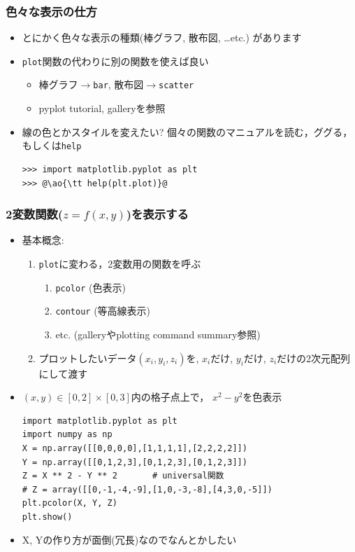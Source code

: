\documentclass[10pt,dvipdfmx]{beamer}
\newcommand{\ao}[1]{{\color{blue}#1}}
\begin{document}
\begin{frame}[fragile]
\frametitle{色々な表示の仕方}
\begin{itemize}
\item とにかく色々な表示の種類(棒グラフ, 散布図, \ldots etc.)
があります
\item {\tt plot}関数の代わりに別の関数を使えば良い
  \begin{itemize}
  \item 棒グラフ$\rightarrow$\ao{\texttt{bar}}, 
    散布図$\rightarrow$\ao{\texttt{scatter}}
  \item pyplot tutorial, galleryを参照
  \end{itemize}

\item 線の色とかスタイルを変えたい?
個々の関数のマニュアルを読む，ググる，もしくは\ao{\tt help}
\begin{lstlisting}
>>> import matplotlib.pyplot as plt
>>> @\ao{\tt help(plt.plot)}@
\end{lstlisting}
\end{itemize}
\end{frame}


\begin{frame}[fragile]
\frametitle{2変数関数($z = f(x, y)$)を表示する}
\begin{itemize}
\item 基本概念: 
\begin{enumerate}
\item {\tt plot}に変わる，2変数用の関数を呼ぶ
  \begin{enumerate}
  \item \ao{\tt pcolor} (色表示)
  \item \ao{\tt contour} (等高線表示)
  \item etc. (galleryやplotting command summary参照)
  \end{enumerate}
\item プロットしたいデータ$(x_i, y_i, z_i)$を, 
$x_i$だけ, $y_i$だけ, $z_i$だけの2次元配列にして渡す
\end{enumerate}

\item $(x, y) \in [0,2]\times[0,3]$内の格子点上で，
$x^2 - y^2$を色表示

\begin{lstlisting}
import matplotlib.pyplot as plt
import numpy as np 
X = np.array([[0,0,0,0],[1,1,1,1],[2,2,2,2]])
Y = np.array([[0,1,2,3],[0,1,2,3],[0,1,2,3]])
Z = X ** 2 - Y ** 2       # universal関数
# Z = array([[0,-1,-4,-9],[1,0,-3,-8],[4,3,0,-5]])
plt.pcolor(X, Y, Z)
plt.show()
\end{lstlisting}

\item X, Yの作り方が面倒(冗長)なのでなんとかしたい
\end{itemize}
\end{frame}
\end{document}
